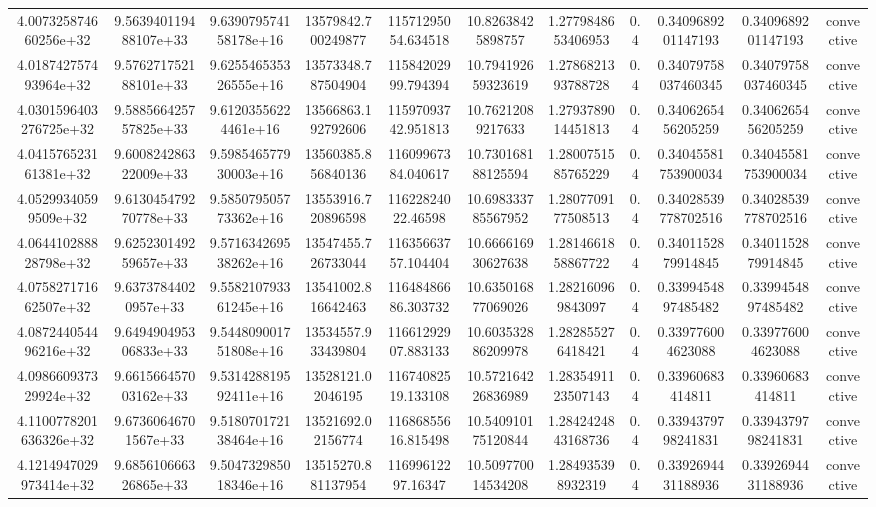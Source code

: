 \begin{table}
\begin{tabular}{ccccccccccc}
4.007325874660256e+32 & 9.563940119488107e+33 & 9.639079574158178e+16 & 13579842.700249877 & 11571295054.634518 & 10.82638425898757 & 1.2779848653406953 & 0.4 & 0.3409689201147193 & 0.3409689201147193 & convective \\
4.018742757493964e+32 & 9.576271752188101e+33 & 9.625546535326555e+16 & 13573348.787504904 & 11584202999.794394 & 10.794192659323619 & 1.2786821393788728 & 0.4 & 0.34079758037460345 & 0.34079758037460345 & convective \\
4.0301596403276725e+32 & 9.588566425757825e+33 & 9.61203556224461e+16 & 13566863.192792606 & 11597093742.951813 & 10.76212089217633 & 1.2793789014451813 & 0.4 & 0.3406265456205259 & 0.3406265456205259 & convective \\
4.041576523161381e+32 & 9.600824286322009e+33 & 9.598546577930003e+16 & 13560385.856840136 & 11609967384.040617 & 10.730168188125594 & 1.2800751585765229 & 0.4 & 0.34045581753900034 & 0.34045581753900034 & convective \\
4.05299340599509e+32 & 9.613045479270778e+33 & 9.585079505773362e+16 & 13553916.720896598 & 11622824022.46598 & 10.698333785567952 & 1.2807709177508513 & 0.4 & 0.34028539778702516 & 0.34028539778702516 & convective \\
4.064410288828798e+32 & 9.625230149259657e+33 & 9.571634269538262e+16 & 13547455.726733044 & 11635663757.104404 & 10.666616930627638 & 1.2814661858867722 & 0.4 & 0.3401152879914845 & 0.3401152879914845 & convective \\
4.075827171662507e+32 & 9.63737844020957e+33 & 9.558210793361245e+16 & 13541002.816642463 & 11648486686.303732 & 10.635016877069026 & 1.282160969843097 & 0.4 & 0.3399454897485482 & 0.3399454897485482 & convective \\
4.087244054496216e+32 & 9.649490495306833e+33 & 9.544809001751808e+16 & 13534557.933439804 & 11661292907.883133 & 10.603532886209978 & 1.282855276418421 & 0.4 & 0.339776004623088 & 0.339776004623088 & convective \\
4.098660937329924e+32 & 9.661566457003162e+33 & 9.531428819592411e+16 & 13528121.02046195 & 11674082519.133108 & 10.572164226836989 & 1.2835491123507143 & 0.4 & 0.33960683414811 & 0.33960683414811 & convective \\
4.1100778201636326e+32 & 9.67360646701567e+33 & 9.518070172138464e+16 & 13521692.02156774 & 11686855616.815498 & 10.540910175120844 & 1.2842424843168736 & 0.4 & 0.3394379798241831 & 0.3394379798241831 & convective \\
4.1214947029973414e+32 & 9.685610666326865e+33 & 9.504732985018346e+16 & 13515270.881137954 & 11699612297.16347 & 10.509770014534208 & 1.284935398932319 & 0.4 & 0.3392694431188936 & 0.3392694431188936 & convective \\

\end{tabular}
\end{table}
